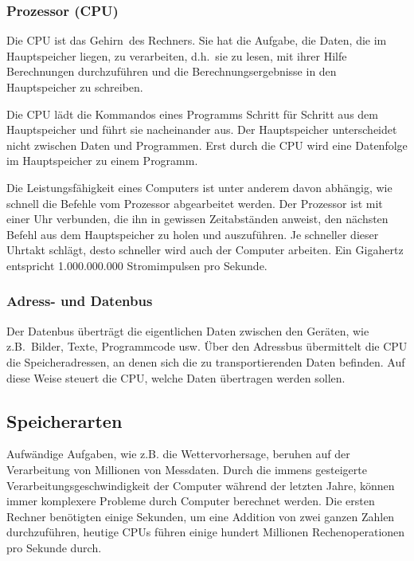 \subsubsection{Prozessor (CPU)}

Die CPU ist das \glqq Gehirn\grqq\ des Rechners. Sie hat die Aufgabe, die Daten,
die im Hauptspeicher liegen, zu verarbeiten, d.h.\ sie zu lesen, mit ihrer Hilfe
Berechnungen durchzuführen und die Berechnungsergebnisse in den Hauptspeicher
zu schreiben.

Die CPU lädt die Kommandos eines Programms Schritt für Schritt aus dem
Hauptspeicher und führt sie nacheinander aus. Der Hauptspeicher unterscheidet
nicht zwischen Daten und Programmen. Erst durch die CPU wird eine Datenfolge im
Hauptspeicher zu einem Programm.

Die Leistungsfähigkeit eines Computers ist unter anderem davon abhängig, wie
schnell die Befehle vom Prozessor abgearbeitet werden. Der Prozessor ist mit
einer Uhr verbunden, die ihn in gewissen Zeitabständen anweist, den nächsten
Befehl aus dem Hauptspeicher zu holen und auszuführen. Je schneller dieser
Uhrtakt schlägt, desto schneller wird auch der Computer arbeiten. Ein Gigahertz
entspricht 1.000.000.000 Stromimpulsen pro Sekunde.

\subsubsection{Adress- und Datenbus}

Der Datenbus überträgt die eigentlichen Daten zwischen den Geräten, wie z.B.\
Bilder, Texte, Programmcode usw. Über den Adressbus übermittelt die CPU die
Speicheradressen, an denen sich die zu transportierenden Daten befinden. Auf
diese Weise steuert die CPU, welche Daten übertragen werden sollen.

\subsection{Speicherarten}

Aufwändige Aufgaben, wie z.B. die Wettervorhersage, beruhen auf der
Verarbeitung von Millionen von Messdaten. Durch die immens gesteigerte
Verarbeitungsgeschwindigkeit der Computer während der letzten Jahre, können
immer komplexere Probleme durch Computer berechnet werden. Die ersten Rechner
benötigten einige Sekunden, um eine Addition von zwei ganzen Zahlen
durchzuführen, heutige CPUs führen einige hundert Millionen Rechenoperationen
pro Sekunde durch.

